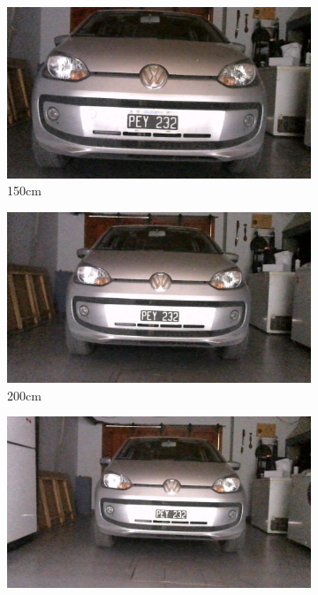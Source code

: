 \begin{figure}
\begin{subfigure}{.3\textwidth}
        \centering
        \includegraphics[width=\textwidth]{imgs/test-distancia/0_150.jpg}
        \caption{150cm}
    \end{subfigure}
    \begin{subfigure}{.3\textwidth}
        \centering
        \includegraphics[width=\textwidth]{imgs/test-distancia/0_200.jpg}
        \caption{200cm}
    \end{subfigure}
    \begin{subfigure}{.3\textwidth}
        \centering
        \includegraphics[width=\textwidth]{imgs/test-distancia/0_250.jpg}

\end{subfigure}
\end{figure}
